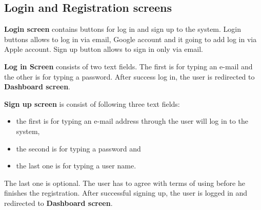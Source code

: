 \subsection{Login and Registration screens}\label{subsec:login-screen}
\textbf{Login screen} contains buttons for log in and sign up to the system.
Login buttons allows to log in via email, Google account and it going to add log in via Apple account.
Sign up button allows to sign in only via email.

\textbf{Log in Screen} consists of two text fields.
The first is for typing an e-mail and the other is for typing a password.
After success log in, the user is redirected to \textbf{Dashboard screen}.

\textbf{Sign up screen} is consist of following three text fields:
\begin{itemize}
    \item the first is for typing an e-mail address through the user will log in to the system,
    \item the second is for typing a password and
    \item the last one is for typing a user name.
\end{itemize}
The last one is optional.
The user has to agree with terms of using before he finishes the registration.
After successful signing up, the user is logged in and redirected to \textbf{Dashboard screen}.
